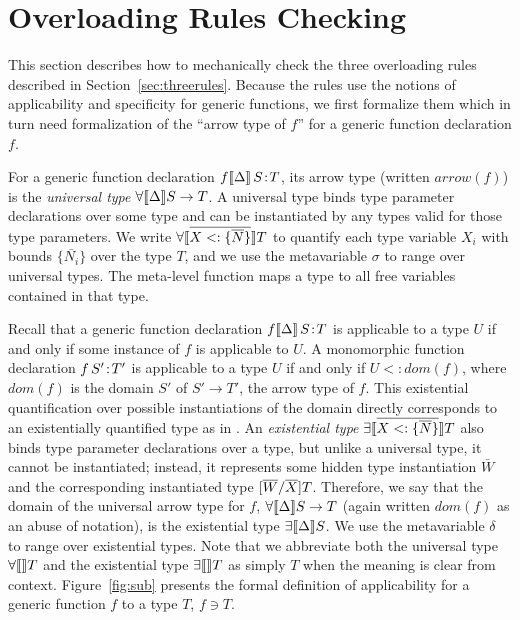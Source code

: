 \section{Overloading Rules Checking}
\label{sec:checking}

This section describes how to mechanically check 
the three overloading rules described in Section~\ref{sec:threerules}.
Because the rules use the notions of applicability and specificity for generic functions,
we first formalize them which in turn need formalization of
the ``arrow type of $f$'' for a generic function declaration $f$.

For a generic function declaration $\mbox{\ensuremath{f \llbracket {\Delta} \rrbracket\, S\!:\!T}}$,
its arrow type (written $\textit{arrow}(f)$) is
the \emph{universal type} \mbox{$\forall\llbracket {\Delta} \rrbracket S \rightarrow T$}.
A universal type binds type parameter declarations over some type and
can be instantiated by any types valid for those type parameters.
We write $\forall\llbracket {\ensuremath{\overline{{X} <: \{\overline{N}\}}}} \rrbracket T$ to quantify each type variable $X_i$ with bounds
$\{\bar{N_i}\}$ over the type $T$, and we use the metavariable $\sigma$ to range over universal types.
The meta-level function  maps a type to all free variables contained in that type. 

Recall that a generic function declaration $\mbox{\ensuremath{f \llbracket {\Delta} \rrbracket\, S\!:\!T}}$ 
is applicable to a type $U$
if and only if some instance of $f$ is applicable to $U$.
A monomorphic function declaration $\mbox{\ensuremath{{f}\,{S'}\!:\!{T'}}}$ is applicable to a type $U$
if and only if $U <: \textit{dom}(f)$,
where $\textit{dom}(f)$ is the domain $S'$ of $S' \rightarrow T'$, the arrow type of $f$.
This existential quantification over possible
instantiations of the domain directly corresponds to an existentially
quantified type as in \cite{bourdoncle97}. An \emph{existential type}
$\exists\llbracket {\ensuremath{\overline{{X} <: \{\overline{N}\}}}} \rrbracket T$ also binds type parameter declarations over a type, but
unlike a universal type, it cannot be instantiated; instead, it represents
some hidden type instantiation $\bar{W}$ and the corresponding instantiated
type $[\overline{W}/\overline{X}]T$. Therefore, we say that the domain of the universal arrow type for $f$,
$\forall\llbracket {\Delta} \rrbracket S \rightarrow T$ (again written $\textit{dom}(f)$ as an abuse of notation),
is the existential type $\exists\llbracket {\Delta} \rrbracket{S}$.
We use the metavariable $\delta$ to range over existential types.
Note that we abbreviate both the universal type $\forall\llbracket {} \rrbracket T$ and
the existential type $\exists\llbracket {} \rrbracket T$ as simply $T$ when the meaning is clear from context.
Figure~\ref{fig:sub} presents the formal definition of applicability for a generic function $f$
to a type $T$, $f \ni T$.

